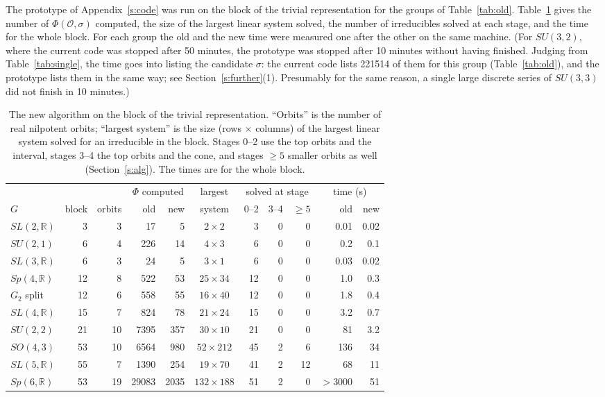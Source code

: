 \documentclass[11pt,leqno]{article}
\theoremstyle{definition}
\numberwithin{equation}{section}
\newcommand{\Ob}{\mathcal O}
\newcommand{\R}{\mathbb R}
\begin{document}
The prototype of Appendix~\ref{s:code} was run on the block of the trivial
representation for the groups of Table~\ref{tab:old}.  Table~\ref{tab:blocks}
gives the number of $\Phi(\Ob,\sigma)$ computed, the size of the largest
linear system solved, the number of irreducibles solved at each stage, and
the time for the whole block.  For each group the old and the new time were
measured one after the other on the same machine.  (For $SU(3,2)$, where the
current code was stopped after 50 minutes, the prototype was stopped after
10 minutes without having finished.  Judging from Table~\ref{tab:single},
the time goes into listing the candidate $\sigma$: the current code lists
221514 of them for this group (Table~\ref{tab:old}), and the prototype lists
them in the same way; see Section~\ref{s:further}(1).  Presumably for the
same reason, a single large discrete series of $SU(3,3)$ did not finish in
10 minutes.)

\begin{table}[ht]
\centering
\begin{tabular}{lrrrrcrrrrr}
\toprule
 & & & \multicolumn{2}{c}{$\Phi$ computed} & largest
 & \multicolumn{3}{c}{solved at stage} & \multicolumn{2}{c}{time (s)}\\
$G$ & block & orbits & old & new & system & 0--2 & 3--4 & $\ge 5$ & old & new\\
\midrule
$SL(2,\R)$ & 3 & 3 & 17 & 5 & $2\times 2$ & 3 & 0 & 0 & 0.01 & 0.02\\
$SU(2,1)$ & 6 & 4 & 226 & 14 & $4\times 3$ & 6 & 0 & 0 & 0.2 & 0.1\\
$SL(3,\R)$ & 6 & 3 & 24 & 5 & $3\times 1$ & 6 & 0 & 0 & 0.03 & 0.02\\
$Sp(4,\R)$ & 12 & 8 & 522 & 53 & $25\times 34$ & 12 & 0 & 0 & 1.0 & 0.3\\
$G_2$ split & 12 & 6 & 558 & 55 & $16\times 40$ & 12 & 0 & 0 & 1.8 & 0.4\\
$SL(4,\R)$ & 15 & 7 & 824 & 78 & $21\times 24$ & 15 & 0 & 0 & 3.2 & 0.7\\
$SU(2,2)$ & 21 & 10 & 7395 & 357 & $30\times 10$ & 21 & 0 & 0 & 81 & 3.2\\
$SO(4,3)$ & 53 & 10 & 6564 & 980 & $52\times 212$ & 45 & 2 & 6 & 136 & 34\\
$SL(5,\R)$ & 55 & 7 & 1390 & 254 & $19\times 70$ & 41 & 2 & 12 & 68 & 11\\
$Sp(6,\R)$ & 53 & 19 & 29083 & 2035 & $132\times 188$ & 51 & 2 & 0 & $>3000$ & 51\\
\bottomrule
\end{tabular}
\caption{The new algorithm on the block of the trivial representation.
``Orbits'' is the number of real nilpotent orbits; ``largest system'' is the
size (rows $\times$ columns) of the largest linear system solved for an
irreducible in the block.  Stages 0--2 use the top orbits and the interval,
stages 3--4 the top orbits and the cone, and stages $\ge 5$ smaller orbits as
well (Section~\ref{s:alg}).  The times are for the whole block.}
\label{tab:blocks}
\end{table}
\end{document}
